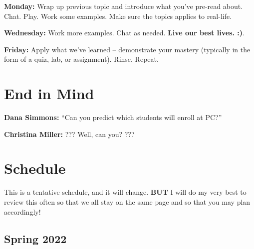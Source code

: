 \documentclass[
]{book}
\begin{document}
\textbf{Monday:} Wrap up previous topic and introduce what you've pre-read about. Chat. Play. Work some examples. Make sure the topics applies to real-life.

\textbf{Wednesday:} Work more examples. Chat as needed. \textbf{Live our best lives. :)}.

\textbf{Friday:} Apply what we've learned -- demonstrate your mastery (typically in the form of a quiz, lab, or assignment). Rinse. Repeat.

\hypertarget{end-in-mind}{%
\chapter{End in Mind}\label{end-in-mind}}

\textbf{Dana Simmons:} ``Can you predict which students will enroll at PC?''

\textbf{Christina Miller:} ??? Well, can you? ???

\hypertarget{schedule}{%
\chapter{Schedule}\label{schedule}}

This is a tentative schedule, and it will change. \textbf{BUT} I will do my very best to review this often so that we all stay on the same page and so that you may plan accordingly!

\hypertarget{spring-2022}{%
\section*{Spring 2022}\label{spring-2022}}
\end{document}
